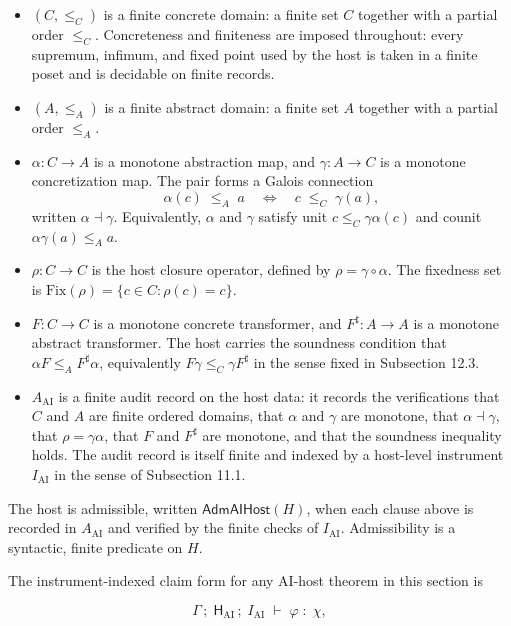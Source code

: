 \documentclass[11pt]{article}
\providecommand{\tightlist}{}
\theoremstyle{definition}
\begin{document}
\begin{itemize}
\tightlist
\item
  \((C,\le_C)\) is a finite concrete domain: a finite set \(C\) together with a partial order \(\le_C\). Concreteness and finiteness are imposed throughout: every supremum, infimum, and fixed point used by the host is taken in a finite poset and is decidable on finite records.
\item
  \((A,\le_A)\) is a finite abstract domain: a finite set \(A\) together with a partial order \(\le_A\).
\item
  \(\alpha:C\to A\) is a monotone abstraction map, and \(\gamma:A\to C\) is a monotone concretization map. The pair forms a Galois connection
  \[
  \alpha(c)\;\le_A\;a\quad\Longleftrightarrow\quad c\;\le_C\;\gamma(a),
  \]
  written \(\alpha\dashv\gamma\). Equivalently, \(\alpha\) and \(\gamma\) satisfy unit \(c\le_C\gamma\alpha(c)\) and counit \(\alpha\gamma(a)\le_A a\).
\item
  \(\rho:C\to C\) is the host closure operator, defined by \(\rho=\gamma\circ\alpha\). The fixedness set is \(\mathrm{Fix}(\rho)=\{c\in C:\rho(c)=c\}\).
\item
  \(F:C\to C\) is a monotone concrete transformer, and \(F^{\sharp}:A\to A\) is a monotone abstract transformer. The host carries the soundness condition that \(\alpha F\le_A F^{\sharp}\alpha\), equivalently \(F\gamma\le_C\gamma F^{\sharp}\) in the sense fixed in Subsection 12.3.
\item
  \(A_{\mathrm{AI}}\) is a finite audit record on the host data: it records the verifications that \(C\) and \(A\) are finite ordered domains, that \(\alpha\) and \(\gamma\) are monotone, that \(\alpha\dashv\gamma\), that \(\rho=\gamma\alpha\), that \(F\) and \(F^{\sharp}\) are monotone, and that the soundness inequality holds. The audit record is itself finite and indexed by a host-level instrument \(I_{\mathrm{AI}}\) in the sense of Subsection 11.1.
\end{itemize}

The host is admissible, written \(\mathsf{AdmAIHost}(H)\), when each clause above is recorded in \(A_{\mathrm{AI}}\) and verified by the finite checks of \(I_{\mathrm{AI}}\). Admissibility is a syntactic, finite predicate on \(H\).

The instrument-indexed claim form for any AI-host theorem in this section is

\[
\Gamma\,;\;\mathsf H_{\mathrm{AI}}\,;\;I_{\mathrm{AI}}\;\vdash\;\varphi\;:\;\chi,
\]
\end{document}
